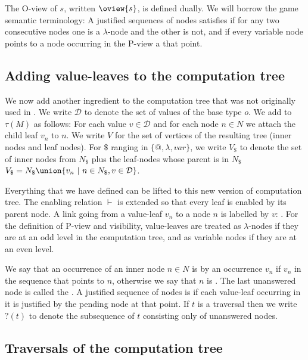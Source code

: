 The O-view of $s$, written $\oview{s}$, is defined dually. We will borrow the game semantic terminology: A justified sequences of nodes satisfies  if for any two consecutive nodes one is a $\lambda$-node and the other is not, and  if every variable node points to a node occurring in the P-view a that point.

\subsection{Adding value-leaves to the computation tree}

We now add another ingredient to the computation tree that was not originally used in \cite{OngLics2006}.  We write $\mathcal{D}$ to denote the set of values of the base type $o$.  We add
 to $\tau(M)$ as follows: For each value $v
\in \mathcal{D}$ and for each node $n \in N$ we attach the child leaf $v_n$ to $n$.  We write $V$ for the set of vertices of the resulting tree (\ie inner nodes and leaf nodes). For $\$$ ranging in $\{@, \lambda, var \}$, we write $V_\$$ to denote the set of inner nodes from $N_\$$ plus the leaf-nodes whose parent is in $N_\$$ \ie $V_\$ = N_\$ \union \{ v_n \ | \ n \in N_\$, v \in \mathcal{D} \}$.


Everything that we have defined can be lifted to this new version of computation tree. The enabling relation $\vdash$ is extended so that every leaf is enabled by its parent node. A link going from a value-leaf $v_n$ to a node $n$ is labelled by $v$: . For the definition of P-view and visibility, value-leaves are treated as $\lambda$-nodes if they are at an odd level in the computation tree, and as variable nodes if they are at an even level.

We say that an occurrence of an inner node $n \in N$ is
 by an occurrence $v_n$ if $v_n$ in
the sequence that points to $n$, otherwise we say that $n$ is
. The last unanswered node is called the
.  A justified sequence of nodes is
 if each value-leaf occurring in it is justified by the pending node at that point.  If $t$ is a traversal then we write
$?(t)$ to denote the subsequence of $t$ consisting only of unanswered nodes.

\subsection{Traversals of the computation tree}
\label{subsec:traversal}

